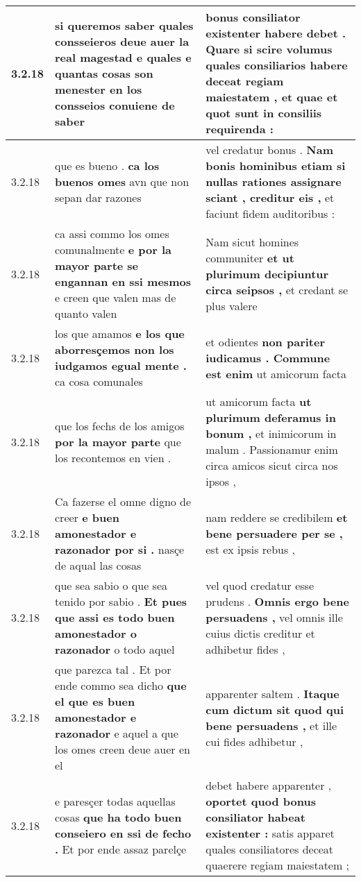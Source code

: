 \begin{tabular}{|p{1cm}|p{6.5cm}|p{6.5cm}|}
3.2.18 & si queremos saber \textbf{ quales consseieros deue auer la real magestad e quales e quantas cosas son menester } en los consseios conuiene de saber & bonus consiliator existenter habere debet . \textbf{ Quare si scire volumus quales consiliarios habere deceat regiam maiestatem , } et quae et quot sunt in consiliis requirenda : \\\hline
3.2.18 & que es bueno . \textbf{ ca los buenos omes } avn que non sepan dar razones & vel credatur bonus . \textbf{ Nam bonis hominibus etiam si nullas rationes assignare sciant , creditur eis , } et faciunt fidem auditoribus : \\\hline
3.2.18 & ca assi commo los omes comunalmente \textbf{ e por la mayor parte se engannan en ssi mesmos } e creen que valen mas de quanto valen & Nam sicut homines communiter \textbf{ et ut plurimum decipiuntur circa seipsos , } et credant se plus valere \\\hline
3.2.18 & los que amamos \textbf{ e los que aborresçemos non los iudgamos egual mente . } ca cosa comunales & et odientes \textbf{ non pariter iudicamus . Commune est enim } ut amicorum facta \\\hline
3.2.18 & que los fechs de los amigos \textbf{ por la mayor parte } que los recontemos en vien . & ut amicorum facta \textbf{ ut plurimum deferamus in bonum , } et inimicorum in malum . Passionamur enim circa amicos sicut circa nos ipsos , \\\hline
3.2.18 & Ca fazerse el omne digno de creer \textbf{ e buen amonestador e razonador por si . } nasçe de aqual las cosas & nam reddere se credibilem \textbf{ et bene persuadere per se , } est ex ipsis rebus , \\\hline
3.2.18 & que sea sabio o que sea tenido por sabio . \textbf{ Et pues que assi es todo buen amonestador o razonador } o todo aquel & vel quod credatur esse prudens . \textbf{ Omnis ergo bene persuadens , } vel omnis ille cuius dictis creditur et adhibetur fides , \\\hline
3.2.18 & que parezca tal . Et por ende commo sea dicho \textbf{ que el que es buen amonestador e razonador } e aquel a que los omes creen deue auer en el & apparenter saltem . \textbf{ Itaque cum dictum sit quod qui bene persuadens , } et ille cui fides adhibetur , \\\hline
3.2.18 & e paresçer todas aquellas cosas \textbf{ que ha todo buen conseiero en ssi de fecho . } Et por ende assaz parelçe & debet habere apparenter , \textbf{ oportet quod bonus consiliator habeat existenter : } satis apparet quales consiliatores deceat quaerere regiam maiestatem ; \\\hline

\end{tabular}

